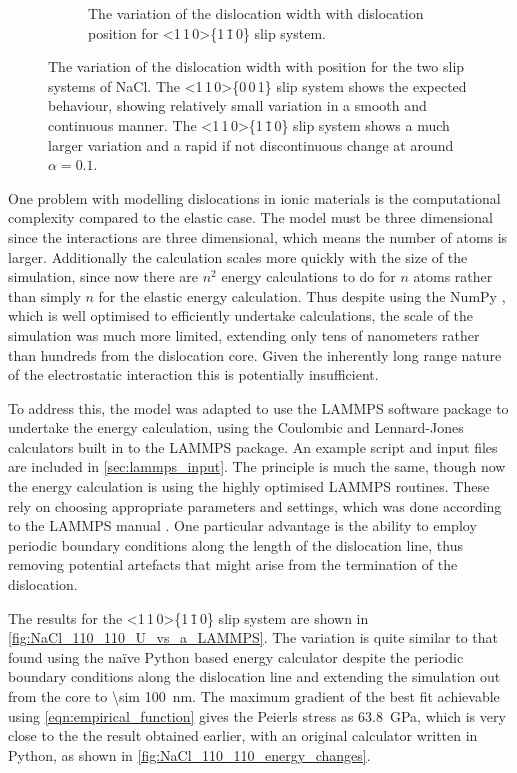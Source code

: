 \begin{figure}
\begin{subfigure}{0.4\textwidth}
\caption{The variation of the dislocation width with dislocation position for <1\,1\,0>\{1\,\={1}\,0\} slip system.\label{fig:NaCl_110_110_w_variation}}
\end{subfigure}
\caption[The variation of the dislocation width with position for NaCl.]{The variation of the dislocation width with position for the two slip systems of NaCl. The <1\,1\,0>\{0\,0\,1\} slip system shows the expected behaviour, showing relatively small variation in a smooth and continuous manner. The <1\,1\,0>\{1\,\={1}\,0\} slip system shows a much larger variation and a rapid if not discontinuous change at around $\alpha=0.1$.\label{fig:NaCl_w_vs_alpha}}
\end{figure}

One problem with modelling dislocations in ionic materials is the computational complexity compared to the elastic case. The model must be three dimensional since the interactions are three dimensional, which means the number of atoms is larger. Additionally the calculation scales more quickly with the size of the simulation, since now there are $n^2$ energy calculations to do for $n$ atoms rather than simply $n$ for the elastic energy calculation. Thus despite using the NumPy \citep{Numpy2011}, which is well optimised to efficiently undertake calculations, the scale of the simulation was much more limited, extending only tens of nanometers rather than hundreds from the dislocation core. Given the inherently long range nature of the electrostatic interaction this is potentially insufficient.

To address this, the model was adapted to use the LAMMPS \cite{LAMMPS_web} software package to undertake the energy calculation, using the Coulombic and Lennard-Jones calculators built in to the LAMMPS package. An example script and input files are included in \autoref{sec:lammps_input}. The principle is much the same, though now the energy calculation is using the highly optimised LAMMPS routines. These rely on choosing appropriate parameters and settings, which was done according to the LAMMPS manual \cite{LAMMPS_web}. One particular advantage is the ability to employ periodic boundary conditions along the length of the dislocation line, thus removing potential artefacts that might arise from the termination of the dislocation.

The results for the <1\,1\,0>\{1\,\={1}\,0\} slip system are shown in \autoref{fig:NaCl_110_110_U_vs_a_LAMMPS}. The variation is quite similar to that found using the na\"ive Python based energy calculator despite the periodic boundary conditions along the dislocation line and extending the simulation out from the core to \SI{\sim 100}{\nano\meter}. The maximum gradient of the best fit achievable using \autoref{eqn:empirical_function} gives the Peierls stress as \SI{63.8}{\giga\pascal}, which is very close to the the result obtained earlier, with an original calculator written in Python, as shown in \autoref{fig:NaCl_110_110_energy_changes}. 


